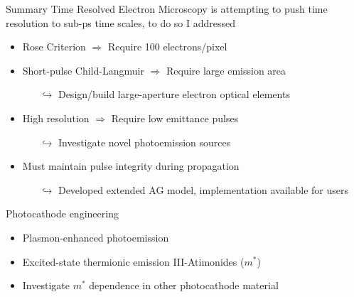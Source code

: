 \documentclass[mathserif]{beamer}
\begin{document}
\begin{frame}{Summary}
Time Resolved Electron Microscopy is attempting to push time resolution to sub-ps time scales, to do so I addressed
\begin{itemize}
  \item Rose Criterion $\Rightarrow$ Require 100 electrons/pixel
  \item Short-pulse Child-Langmuir $\Rightarrow$ Require large emission area
  \begin{itemize}
    \item[$\hookrightarrow$] Design/build large-aperture electron optical elements
  \end{itemize}
  \item High resolution $\Rightarrow$ Require low emittance pulses
  \begin{itemize}
    \item[$\hookrightarrow$] Investigate novel photoemission sources
  \end{itemize}
  \item Must maintain pulse integrity during propagation
  \begin{itemize}
    \item[$\hookrightarrow$] Developed extended AG model, implementation available for users
  \end{itemize}
\end{itemize}

Photocathode engineering
\begin{itemize}
  \item Plasmon-enhanced photoemission
  \item Excited-state thermionic emission III-Atimonides ($m^*$)
  \item Investigate $m^*$ dependence in other photocathode material
\end{itemize}

\end{frame}
\end{document}
